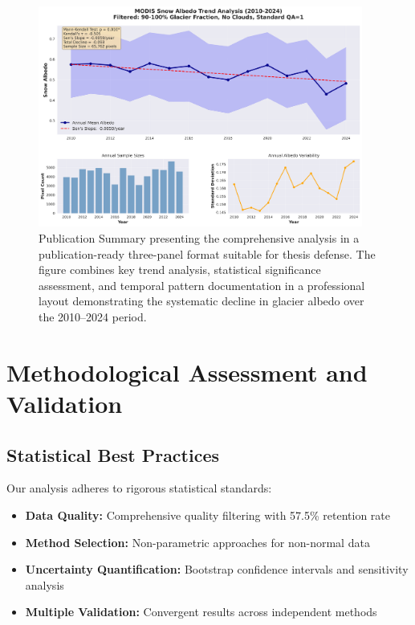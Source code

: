 \documentclass[12pt,a4paper]{article}
\begin{document}
\begin{figure}[H]
\centering
\includegraphics[width=0.95\textwidth]{../../results/plots/comprehensive_summary.png}
\caption{Publication Summary presenting the comprehensive analysis in a publication-ready three-panel format suitable for thesis defense. The figure combines key trend analysis, statistical significance assessment, and temporal pattern documentation in a professional layout demonstrating the systematic decline in glacier albedo over the 2010--2024 period.}
\label{fig:publication_summary}
\end{figure}

\section{Methodological Assessment and Validation}

\subsection{Statistical Best Practices}

Our analysis adheres to rigorous statistical standards:

\begin{itemize}
    \item \textbf{Data Quality:} Comprehensive quality filtering with 57.5\% retention rate
    \item \textbf{Method Selection:} Non-parametric approaches for non-normal data
    \item \textbf{Uncertainty Quantification:} Bootstrap confidence intervals and sensitivity analysis
    \item \textbf{Multiple Validation:} Convergent results across independent methods
\end{itemize}
\end{document}
